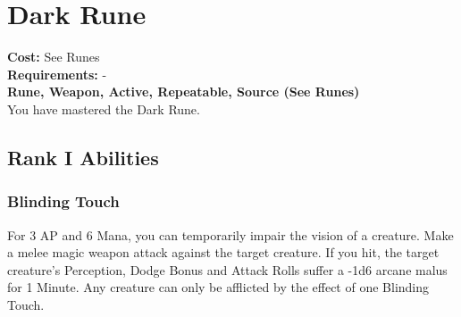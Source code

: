\section{Dark Rune}\label{rune:dark}
\textbf{Cost:} See Runes\\
\textbf{Requirements:} -\\
\textbf{Rune, Weapon, Active, Repeatable, Source (See Runes)}\\
You have mastered the Dark Rune.

\subsection{Rank I Abilities}

\subsubsection{Blinding Touch}
For 3 AP and 6 Mana, you can temporarily impair the vision of a creature.
Make a melee magic weapon attack against the target creature.
If you hit, the target creature's Perception, Dodge Bonus and Attack Rolls suffer a -1d6 arcane malus for 1 Minute.
Any creature can only be afflicted by the effect of one Blinding Touch.
